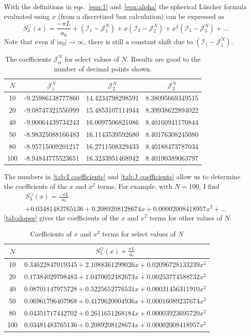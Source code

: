 \documentclass[11pt]{article}
\begin{document}
With the definitions in eqs.~\eqref{eqn:1} and~\eqref{eqn:alpha} the spherical L\"uscher formula evaluated using $x$ (from a discretized box calculation) can be expressed as
\begin{equation}
S^\bigcirc_3(x)=\frac{-\pi L}{a_0}+\left(\mathcal{I}_1-\mathcal{J}_1^N\right)+x\left(\mathcal{I}_2-\mathcal{J}_2^N\right)+x^2\left(\mathcal{I}_3-\mathcal{J}_3^N\right)+\ldots
\end{equation}
Note that even if $|a_0|\to\infty$, there is still a constant shift due to $\left(\mathcal{I}_1-\mathcal{J}_1^N\right)$.   
\begin{table}
\caption{The coefficients $\mathcal{J}_\alpha^N$ for select values of $N$.  Results are good to the number of decimal points shown. \label{tab:J coefficients}}
\center
\begin{tabular}{c||c|c|c}
$N$ & $\mathcal{J}_1^N$ & $\mathcal{J}_2^N$ &$\mathcal{J}_3^N$ \\
\hline
10 & -9.25986138777860 & 14.4234798298591 & 8.38095669349515\\
20 & -9.08747321556999 & 15.4853107114944 & 8.39938622894022\\
40 & -9.00064439734243 & 16.0097506821086 & 8.40160941170844\\
50 & -8.98325088166483 & 16.1143539592680 & 8.40176308245080\\
80 & -8.95715009201217 & 16.2711508329433 & 8.40188473787034\\
100 & -8.94844775523651 & 16.3233951468942 & 8.40190389063797
\end{tabular}
\end{table}
The numbers in \autoref{tab:I coefficients} and \autoref{tab:J coefficients} allow us to determine the coefficients of the $x$ and $x^2$ terms.  For example, with $N=100$, I find
\begin{multline}
S^\bigcirc_3(x)=\frac{-\pi L}{a_0}\\
+0.03481483765136+0.2089208128674 x+0.00002008418957 x^2+\ldots
\end{multline}
\autoref{tab:slopes} gives the coefficients of the $x$ and $x^2$ terms for other values of $N$.
\begin{table}
\caption{Coefficients of $x$ and $x^2$ terms for select values of $N$\label{tab:slopes}}
\center
\begin{tabular}{c|c}
$N$ & $S^\bigcirc_3(x)+\frac{\pi L}{a_0}$ \\
\hline
10 & $0.34622847019345+2.1088361299026 x+0.02096728133239 x^2$\\
20 & $0.17384029798483+1.0470052482673 x+0.00253774588732 x^2$\\
40 & $0.08701147975728+0.5225652776531 x+0.00031456311910 x^2$\\
50 & $0.06961796407968+0.4179620004936 x+0.00016089237674 x^2$\\
80 & $0.04351717442702+0.2611651268184 x+0.00003923695720 x^2$\\
100 &$0.03481483765136+0.2089208128674 x+0.00002008418957 x^2$
\end{tabular}
\end{table}
\end{document}
